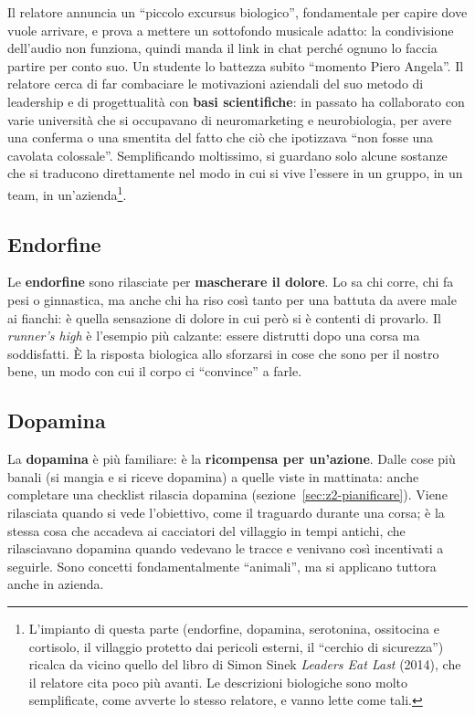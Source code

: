 Il relatore annuncia un ``piccolo excursus biologico'', fondamentale per capire dove vuole
arrivare, e prova a mettere un sottofondo musicale adatto: la condivisione dell'audio non
funziona, quindi manda il link in chat perché ognuno lo faccia partire per conto suo. Un
studente lo battezza subito ``momento Piero Angela''. Il relatore cerca di far combaciare le
motivazioni aziendali del suo metodo di leadership e di progettualità con \textbf{basi
scientifiche}: in passato ha collaborato con varie università che si occupavano di
neuromarketing e neurobiologia, per avere una conferma o una smentita del fatto che ciò che
ipotizzava ``non fosse una cavolata colossale''. Semplificando moltissimo, si guardano solo
alcune sostanze che si traducono direttamente nel modo in cui si vive l'essere in un gruppo,
in un team, in un'azienda\footnote{L'impianto di questa parte (endorfine, dopamina,
serotonina, ossitocina e cortisolo, il villaggio protetto dai pericoli esterni, il ``cerchio
di sicurezza'') ricalca da vicino quello del libro di Simon Sinek \emph{Leaders Eat Last}
(2014), che il relatore cita poco più avanti. Le descrizioni biologiche sono molto
semplificate, come avverte lo stesso relatore, e vanno lette come tali.}.

\subsection{Endorfine}

Le \textbf{endorfine} sono rilasciate per \textbf{mascherare il dolore}. Lo sa chi corre, chi
fa pesi o ginnastica, ma anche chi ha riso così tanto per una battuta da avere male ai
fianchi: è quella sensazione di dolore in cui però si è contenti di provarlo. Il \emph{runner's
high} è l'esempio più calzante: essere distrutti dopo una corsa ma soddisfatti. È la risposta
biologica allo sforzarsi in cose che sono per il nostro bene, un modo con cui il corpo ci
``convince'' a farle.

\subsection{Dopamina}

La \textbf{dopamina} è più familiare: è la \textbf{ricompensa per un'azione}. Dalle cose più
banali (si mangia e si riceve dopamina) a quelle viste in mattinata: anche completare una
checklist rilascia dopamina (sezione~\ref{sec:z2-pianificare}). Viene rilasciata quando si
vede l'obiettivo, come il traguardo durante una corsa; è la stessa cosa che accadeva ai
cacciatori del villaggio in tempi antichi, che rilasciavano dopamina quando vedevano le tracce
e venivano così incentivati a seguirle. Sono concetti fondamentalmente ``animali'', ma si
applicano tuttora anche in azienda.

